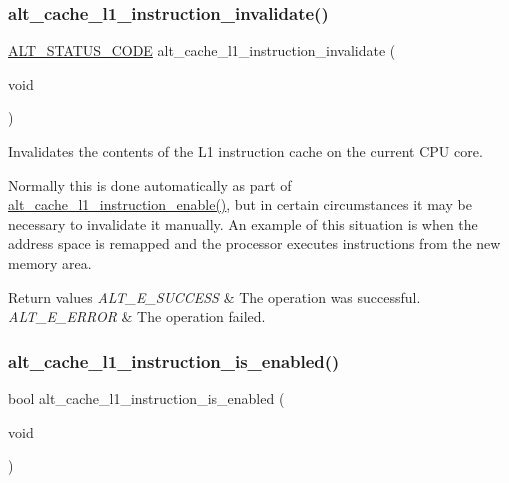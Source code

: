 \subsubsection{\texorpdfstring{alt\_cache\_l1\_instruction\_invalidate()}{alt\_cache\_l1\_instruction\_invalidate()}}
{\footnotesize\ttfamily \mbox{\hyperlink{hwlib_8h_abdb0d369f069723ca55d6c94bcaaaa12}{A\+L\+T\+\_\+\+S\+T\+A\+T\+U\+S\+\_\+\+C\+O\+DE}} alt\+\_\+cache\+\_\+l1\+\_\+instruction\+\_\+invalidate (\begin{DoxyParamCaption}\item[{void}]{ }\end{DoxyParamCaption})}

Invalidates the contents of the L1 instruction cache on the current C\+PU core.

Normally this is done automatically as part of \mbox{\hyperlink{group__CACHE__L1_ga42b3e61800effdf4f2c116a91b552cfc}{alt\+\_\+cache\+\_\+l1\+\_\+instruction\+\_\+enable()}}, but in certain circumstances it may be necessary to invalidate it manually. An example of this situation is when the address space is remapped and the processor executes instructions from the new memory area.


\begin{DoxyRetVals}{Return values}
{\em A\+L\+T\+\_\+\+E\+\_\+\+S\+U\+C\+C\+E\+SS} & The operation was successful. \\
\hline
{\em A\+L\+T\+\_\+\+E\+\_\+\+E\+R\+R\+OR} & The operation failed. \\
\hline
\end{DoxyRetVals}
\mbox{\label{group__CACHE__L1_ga29dc9df650120525447542d61753bf48}} 
\subsubsection{\texorpdfstring{alt\_cache\_l1\_instruction\_is\_enabled()}{alt\_cache\_l1\_instruction\_is\_enabled()}}
{\footnotesize\ttfamily bool alt\+\_\+cache\+\_\+l1\+\_\+instruction\+\_\+is\+\_\+enabled (\begin{DoxyParamCaption}\item[{void}]{ }\end{DoxyParamCaption})}

